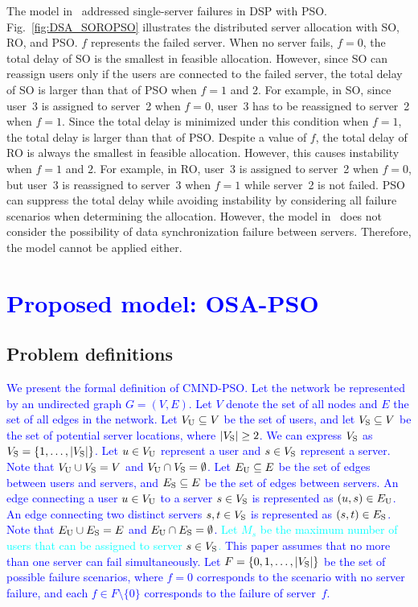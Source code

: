 \documentclass[10pt, letterpaper]{IEEEtran}
\newcommand\blue[1]{\textcolor{blue}{#1}}
\newcommand\cyan[1]{\textcolor{cyan}{#1}}
\begin{document}
\begin{CJK}{UTF8}{ipxm}
The model in~\cite{5_9_Masuda2020} addressed single-server failures in DSP with PSO.
Fig.~\ref{fig:DSA_SOROPSO} illustrates the distributed server allocation with SO, RO, and PSO.
$f$ represents the failed server.
When no server fails, $f = 0$, the total delay of SO is the smallest in feasible allocation.
However, since SO can reassign users only if the users are connected to the failed server, the total delay of SO is larger than that of PSO when $f = 1$ and $2$.
For example, in SO, since user~3 is assigned to server~2 when $f = 0$, user~3 has to be reassigned to server~2 when $f = 1$.
Since the total delay is minimized under this condition when $f = 1$, the total delay is larger than that of PSO.
Despite a value of $f$, the total delay of RO is always the smallest in feasible allocation.
However, this causes instability when $f = 1$ and $2$.
For example, in RO, user~3 is assigned to server~2 when $f = 0$, but user~3 is reassigned to server~3 when $f = 1$ while server~2 is not failed.
PSO can suppress the total delay while avoiding instability by considering all failure scenarios when determining the allocation.
However, the model in~\cite{5_9_Masuda2020} does not consider the possibility of data synchronization failure between servers.
Therefore, the model cannot be applied either.

\section{\blue{Proposed model: OSA-PSO}}
\label{sec:proposed_mode_cmnd_pso}

\subsection{Problem definitions}

\blue{
We present the formal definition of CMND-PSO. Let the network be represented by an undirected graph $G = (V, E)$.
Let $V$ denote the set of all nodes and $E$ the set of all edges in the network.
Let $V_{\rm{U}} \subseteq V$ be the set of users, and let $V_{\rm{S}} \subseteq V$ be the set of potential server locations, where $|V_{\rm{S}}| \geq 2$.
We can express $V_{\rm{S}}$ as $V_{\rm{S}} = \{1, \ldots, |V_{\rm{S}}|\}$.
Let $u \in V_{\rm{U}}$ represent a user and $s \in V_{\rm{S}}$ represent a server.
Note that $V_{\rm{U}} \cup V_{\rm{S}} = V$ and $V_{\rm{U}} \cap V_{\rm{S}} = \emptyset$.
Let $E_{\rm{U}} \subseteq E$ be the set of edges between users and servers, and $E_{\rm{S}} \subseteq E$ be the set of edges between servers.
An edge connecting a user $u \in V_{\rm{U}}$ to a server $s \in V_{\rm{S}}$ is represented as $(u,s) \in E_{\rm{U}}$.
An edge connecting two distinct servers $s, t \in V_{\rm{S}}$ is represented as $(s, t) \in E_{\rm{S}}$.
Note that $E_{\rm U} \cup E_{\rm S} =E$ and $E_{\rm{U}} \cap E_{\rm{S}} = \emptyset$.
\cyan{Let $M_s$ be the maximum number of users that can be assigned to server $s \in V_{\rm{S}}$.}
This paper assumes that no more than one server can fail simultaneously.
Let $F = \{0, 1, \ldots, |V_{\rm{S}}|\}$ be the set of possible failure scenarios, where $f = 0$ corresponds to the scenario with no server failure, and each $f \in F \setminus \{0\}$ corresponds to the failure of server~$f$.
}


\end{CJK}
\end{document}

